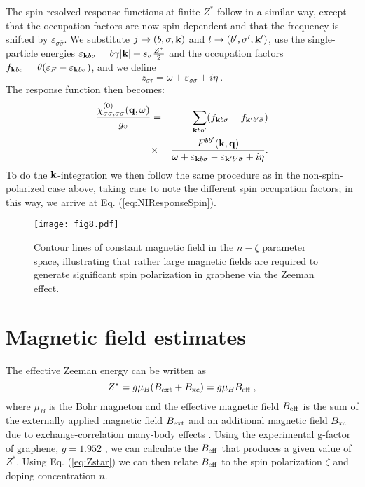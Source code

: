 \documentclass[aps,prb,twocolumn,superscriptaddress]{revtex4-2}
\newcommand{\si}{\sigma}
\newcommand{\sib}{{\bar{\sigma}}}
\newcommand{\ef}{\varepsilon_F}
\newcommand{\bfk}{{\bf k}}
\newcommand{\bfkp}{{\bf k'}}
\newcommand{\zst}{z_{\s\tp}}
\newcommand{\bfq}{{\bf q}}
\newcommand{\tp}{\tau}
\newcommand{\s}{\sigma}
\newcommand{\w}{\omega}
\newcommand{\essb}{\varepsilon_{\si\sib}}
\begin{document}
The spin-resolved response functions at finite $Z^*$ follow in a similar way, except that the occupation factors are now spin dependent and that the frequency is
shifted by $\essb$. We substitute  $j \to (b, \si, \bfk)$ and  $l\to (b', \si', \bfkp)$, use the single-particle energies
$\varepsilon_{\bfk b\si}=b\gamma|\bfk|+s_\si\frac{Z^*}{2}$ and the occupation factors
$f_{\bfk b\si} = \theta(\ef-\varepsilon_{\bfk b\si})$, and we define
\begin{equation}
  \zst = \omega + \essb + i\eta \:.
\end{equation}
The response function then becomes:
\begin{eqnarray}
  \frac{\chi^{(0)}_{\si\sib,\si\sib}(\bfq,\w)}{g_v} &=&
  \sum_{\bfk b b'}    (f_{\bfk b \si}-f_{\bfkp b'\sib})\nonumber\\
  &\times&
    \frac{F^{bb'}(\bfk,\bfq)}{\w+\varepsilon_{\bfk b\si}-\varepsilon_{\bfkp b'\sib}+i\eta}.
  \end{eqnarray}
To do the $\bfk$-integration we then follow the same procedure as in the non-spin-polarized case above,
taking care to note the different spin occupation factors; in this way, we
arrive at Eq. (\ref{eq:NIResponseSpin}).

\begin{figure}
    \texttt{[image: fig8.pdf]}
    \caption{Contour lines of constant magnetic field in the $n-\zeta$ parameter space, illustrating that rather large magnetic fields
    are required to generate significant spin polarization in graphene via the Zeeman effect.}
    \label{fig:MagSplit}
\end{figure}

\section{Magnetic field estimates}\label{appB}

The effective Zeeman energy can be written as
\begin{equation}
    Z^*= g \mu_B (B_{\rm ext} + B_{\rm xc}) =  g \mu_B B_{\rm eff} \:,
    \label{eq:MagSplit}
\end{equation}
where $\mu_B$ is the Bohr magneton and the effective magnetic field $B_{\rm eff}$ is the sum of the externally applied magnetic field $B_{\rm ext}$ and
an additional magnetic field $B_{\rm xc}$ due to exchange-correlation many-body effects \cite{DAmico2019}.
Using the experimental g-factor of graphene, $g=1.952$ \cite{Lyon2017}, we can calculate the $B_{\rm eff}$ that produces
a given value of $Z^*$. Using Eq. (\ref{eq:Zstar}) we can then relate $B_{\rm eff}$ to the spin polarization $\zeta$ and
doping concentration $n$.
\end{document}
